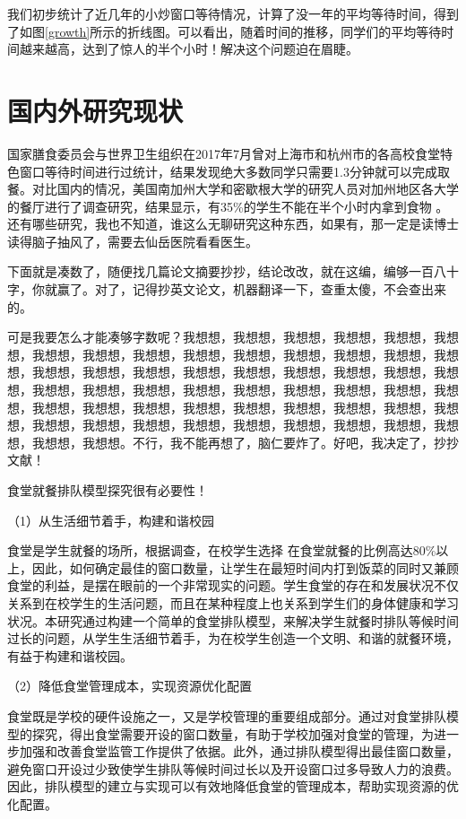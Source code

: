 \documentclass[a4paper,12pt]{book} %
\begin{document}
我们初步统计了近几年的小炒窗口等待情况，计算了没一年的平均等待时间，得到了如图\ref{growth}所示的折线图。可以看出，随着时间的推移，同学们的平均等待时间越来越高，达到了惊人的半个小时！解决这个问题迫在眉睫。

\section{国内外研究现状}

国家膳食委员会与世界卫生组织在2017年7月曾对上海市和杭州市的各高校食堂特色窗口等待时间进行过统计\cite{Khan2006}，结果发现绝大多数同学只需要1.3分钟就可以完成取餐。对比国内的情况，美国南加州大学和密歇根大学的研究人员对加州地区各大学的餐厅进行了调查研究，结果显示，有35\%的学生不能在半个小时内拿到食物 \cite{Marcus2015} 。还有哪些研究，我也不知道，谁这么无聊研究这种东西，如果有，那一定是读博士读得脑子抽风了，需要去仙岳医院看看医生。

下面就是凑数了，随便找几篇论文摘要抄抄，结论改改，就在这编，编够一百八十字，你就赢了。对了，记得抄英文论文，机器翻译一下，查重太傻，不会查出来的。

可是我要怎么才能凑够字数呢？我想想，我想想，我想想，我想想，我想想，我想想，我想想，我想想，我想想，我想想，我想想，我想想，我想想，我想想，我想想，我想想，我想想，我想想，我想想，我想想，我想想，我想想，我想想，我想想，我想想，我想想，我想想，我想想，我想想，我想想，我想想，我想想，我想想，我想想，我想想，我想想，我想想，我想想，我想想，我想想，我想想，我想想，我想想，我想想，我想想，我想想，我想想，我想想，我想想，我想想，我想想，我想想，我想想。不行，我不能再想了，脑仁要炸了。好吧，我决定了，抄抄文献！

食堂就餐排队模型探究很有必要性！

（1）从生活细节着手，构建和谐校园

食堂是学生就餐的场所，根据调查，在校学生选择 在食堂就餐的比例高达80\%以上，因此，如何确定最佳的窗口数量，让学生在最短时间内打到饭菜的同时又兼顾食堂的利益，是摆在眼前的一个非常现实的问题。学生食堂的存在和发展状况不仅关系到在校学生的生活问题，而且在某种程度上也关系到学生们的身体健康和学习状况。本研究通过构建一个简单的食堂排队模型，来解决学生就餐时排队等候时间过长的问题，从学生生活细节着手，为在校学生创造一个文明、和谐的就餐环境，有益于构建和谐校园。

（2）降低食堂管理成本，实现资源优化配置

食堂既是学校的硬件设施之一，又是学校管理的重要组成部分。通过对食堂排队模型的探究，得出食堂需要开设的窗口数量，有助于学校加强对食堂的管理，为进一步加强和改善食堂监管工作提供了依据。此外，通过排队模型得出最佳窗口数量，避免窗口开设过少致使学生排队等候时间过长以及开设窗口过多导致人力的浪费。因此，排队模型的建立与实现可以有效地降低食堂的管理成本，帮助实现资源的优化配置。
\end{document}
